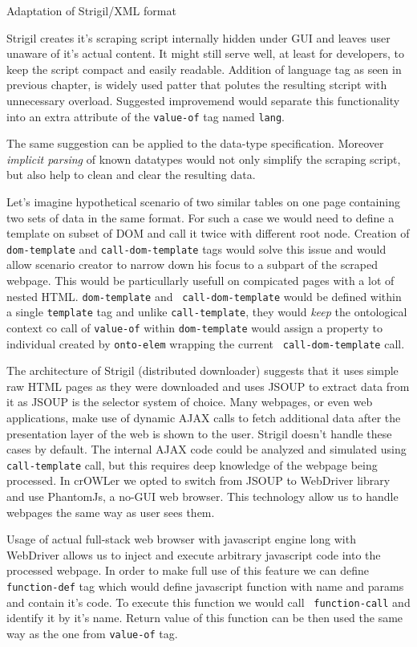 \secc Adaptation of Strigil/XML format

Strigil creates it's scraping script internally hidden under GUI and leaves
user unaware of it's actual content. It might still serve well, at least for
developers, to keep the script compact and easily readable. Addition of
language tag as seen in previous chapter, is widely used patter that polutes
the resulting stcript with unnecessary overload. Suggested improvemend would
separate this functionality into an extra attribute of the {\tt value-of} tag
named {\tt lang}.

The same suggestion can be applied to the data-type specification. Moreover
{\em implicit parsing} of known datatypes would not only simplify the scraping
script, but also help to clean and clear the resulting data. 

Let's imagine hypothetical scenario of two similar tables on one page
containing two sets of data in the same format. For such a case we would need
to define a template on subset of DOM and call it twice with different root
node. Creation of {\tt dom-template} and {\tt call-dom-template} tags would
solve this issue and would allow scenario creator to narrow down his focus to a
subpart of the scraped webpage. This would be particullarly usefull on
compicated pages with a lot of nested HTML. {\tt dom-template} and {\tt
call-dom-template} would be defined within a single {\tt template} tag and
unlike {\tt call-template}, they would {\em keep} the ontological context co
call of {\tt value-of} within {\tt dom-template} would assign a property to
individual created by {\tt onto-elem} wrapping the current {\tt
call-dom-template} call. 

The architecture of Strigil (distributed downloader) suggests that it uses
simple raw HTML pages as they were downloaded and uses JSOUP to extract data
from it as JSOUP is the selector system of choice. Many webpages, or even web
applications, make use of dynamic AJAX calls to fetch additional data after the
presentation layer of the web is shown to the user. Strigil doesn't handle
these cases by default. The internal AJAX code could be analyzed and simulated
using {\tt call-template} call, but this requires deep knowledge of the webpage
being processed. In crOWLer we opted to switch from JSOUP to WebDriver library
and use PhantomJs, a no-GUI web browser. This technology allow us to handle
webpages the same way as user sees them. 

Usage of actual full-stack web browser with javascript engine long with
WebDriver allows us to inject and execute arbitrary javascript code into the
processed webpage. In order to make full use of this feature we can define {\tt
function-def} tag which would define javascript function with name and params
and contain it's code. To execute this function we would call {\tt
function-call} and identify it by it's name. Return value of this function can
be then used the same way as the one from {\tt value-of} tag. 

